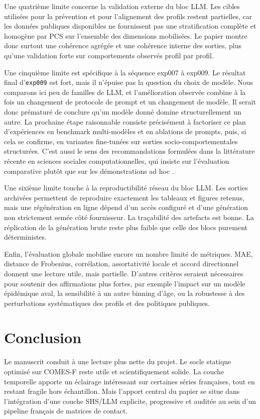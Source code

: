\documentclass[ROIA,Unicode]{cedram}
\begin{document}
Une quatrième limite concerne la validation externe du bloc LLM. Les cibles utilisées pour la prévention et pour l'alignement des profils restent partielles, car les données publiques disponibles ne fournissent pas une stratification complète et homogène par PCS sur l'ensemble des dimensions mobilisées. Le papier montre donc surtout une cohérence agrégée et une cohérence interne des sorties, plus qu'une validation forte sur comportements observés profil par profil.

Une cinquième limite est spécifique à la séquence exp007 à exp009. Le résultat final d'\texttt{exp009} est fort, mais il n'épuise pas la question du choix de modèle. Nous comparons ici peu de familles de LLM, et l'amélioration observée combine à la fois un changement de protocole de prompt et un changement de modèle. Il serait donc prématuré de conclure qu'un modèle donné domine structurellement un autre. La prochaine étape raisonnable consiste précisément à factoriser ce plan d'expériences en benchmark multi-modèles et en ablations de prompts, puis, si cela se confirme, en variantes fine-tunées sur sorties socio-comportementales structurées. C'est aussi le sens des recommandations formulées dans la littérature récente en sciences sociales computationnelles, qui insiste sur l'évaluation comparative plutôt que sur les démonstrations ad hoc \citep{ziems2024css}.

Une sixième limite touche à la reproductibilité réseau du bloc LLM. Les sorties archivées permettent de reproduire exactement les tableaux et figures retenus, mais une régénération en ligne dépend d'un accès configuré et d'une génération non strictement semée côté fournisseur. La traçabilité des artefacts est bonne. La réplication de la génération brute reste plus faible que celle des blocs purement déterministes.

Enfin, l'évaluation globale mobilise encore un nombre limité de métriques. MAE, distance de Frobenius, corrélation, assortativité locale et accord directionnel donnent une lecture utile, mais partielle. D'autres critères seraient nécessaires pour soutenir des affirmations plus fortes, par exemple l'impact sur un modèle épidémique aval, la sensibilité à un autre binning d'âge, ou la robustesse à des perturbations systématiques des profils et des politiques publiques.

\section{Conclusion}
Le manuscrit conduit à une lecture plus nette du projet. Le socle statique optimisé sur COMES-F reste utile et scientifiquement solide. La couche temporelle apporte un éclairage intéressant sur certaines séries françaises, tout en restant fragile hors échantillon. Mais l'apport central du papier se situe dans l'intégration d'une couche SHS/LLM explicite, progressive et auditée au sein d'un pipeline français de matrices de contact.
\end{document}
